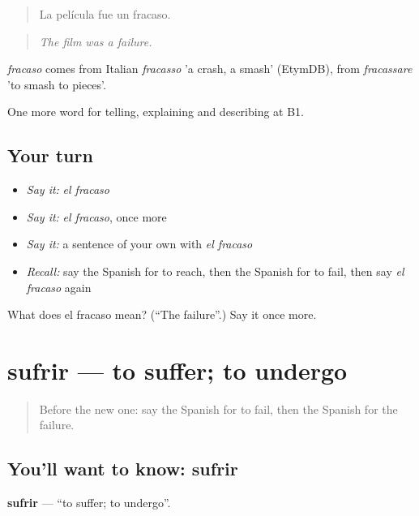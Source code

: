 \begin{quote}
La película fue un fracaso.
\end{quote}

\begin{quote}
\emph{The film was a failure.}
\end{quote}

\begin{cousinweb}
\emph{fracaso} comes from Italian \emph{fracasso} 'a crash, a smash' (EtymDB), from \emph{fracassare} 'to smash to pieces'.
\end{cousinweb}

\begin{grammarlens}[title={What you've built}]
One more word for telling, explaining and describing at B1.
\end{grammarlens}

\subsection*{Your turn}
\begin{itemize}
\raggedright
  \item \emph{Say it:} \emph{el fracaso}
  \item \emph{Say it:} \emph{el fracaso}, once more
  \item \emph{Say it:} a sentence of your own with \emph{el fracaso}
  \item \emph{Recall:} say the Spanish for to reach, then the Spanish for to fail, then say \emph{el fracaso} again
\end{itemize}

\begin{tcolorbox}[breakable,colback=teal!4,colframe=teal!35!black,title={Before you move on}]
What does el fracaso mean? (\textquotedblleft{}The failure\textquotedblright{}.) Say it once more.
\end{tcolorbox}
\section[sufrir]{sufrir — to suffer; to undergo}

\label{lesson:ES-C573-sufrir}



\begin{quote}
Before the new one: say the Spanish for to fail, then the Spanish for the failure.
\end{quote}

\subsection*{You'll want to know: sufrir}
\textbf{sufrir} — \textquotedblleft{}to suffer; to undergo\textquotedblright{}.

